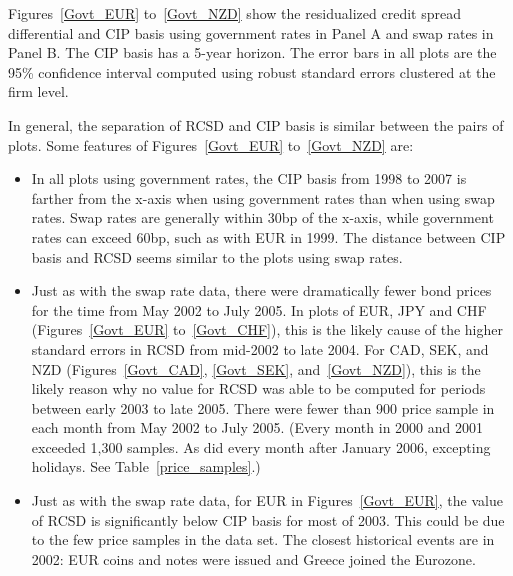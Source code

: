Figures~\ref{Govt_EUR} to~\ref{Govt_NZD} show the residualized credit spread differential and CIP basis using government rates in Panel A and swap rates in Panel B.  The CIP basis has a 5-year horizon.  The error bars in all plots are the 95\% confidence interval computed using robust standard errors clustered at the firm level.


In general, the separation of RCSD and CIP basis is similar between the pairs of plots. Some features of Figures~\ref{Govt_EUR} to~\ref{Govt_NZD} are:
\begin{itemize}

\item In all plots using government rates, the CIP basis from 1998 to 2007 is farther from the x-axis when using government rates than when using swap rates.  Swap rates are generally within 30bp of the x-axis, while government rates can exceed 60bp, such as with EUR in 1999.  The distance between CIP basis and RCSD seems similar to the plots using swap rates.

\item Just as with the swap rate data, there were dramatically fewer bond prices for the time from May 2002 to July 2005.  In plots of EUR, JPY and CHF (Figures~\ref{Govt_EUR} to~\ref{Govt_CHF}), this is the likely cause of the higher standard errors in RCSD from mid-2002 to late 2004.  For CAD, SEK, and NZD (Figures~\ref{Govt_CAD}, \ref{Govt_SEK}, and~\ref{Govt_NZD}), this is the likely reason why no value for RCSD was able to be computed for periods between early 2003 to late 2005.
There were fewer than 900 price sample in each month from May 2002 to July 2005.  (Every month in 2000 and 2001 exceeded 1,300 samples.  As did every month after January 2006, excepting holidays.  See Table~\ref{price_samples}.)  



\item Just as with the swap rate data, for EUR in Figures~\ref{Govt_EUR}, the value of RCSD is significantly below CIP basis for most of 2003.  This could be due to the few price samples in the data set.  The closest historical events are in 2002: EUR coins and notes were issued and Greece joined the Eurozone.  


\end{itemize}
